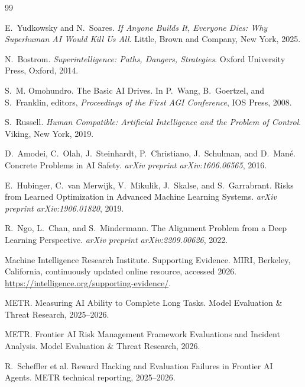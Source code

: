 \documentclass[11pt]{article}
\begin{document}
\begin{thebibliography}{99}

E.~Yudkowsky and N.~Soares.
\newblock \emph{If Anyone Builds It, Everyone Dies: Why Superhuman AI Would Kill Us All}.
\newblock Little, Brown and Company, New York, 2025.

N.~Bostrom.
\newblock \emph{Superintelligence: Paths, Dangers, Strategies}.
\newblock Oxford University Press, Oxford, 2014.

S.~M. Omohundro.
\newblock The Basic AI Drives.
\newblock In P.~Wang, B.~Goertzel, and S.~Franklin, editors,
\emph{Proceedings of the First AGI Conference}, IOS Press, 2008.

S.~Russell.
\newblock \emph{Human Compatible: Artificial Intelligence and the Problem of Control}.
\newblock Viking, New York, 2019.

D.~Amodei, C.~Olah, J.~Steinhardt, P.~Christiano,
J.~Schulman, and D.~Man\'e.
\newblock Concrete Problems in AI Safety.
\newblock \emph{arXiv preprint arXiv:1606.06565}, 2016.

E.~Hubinger, C.~van Merwijk, V.~Mikulik, J.~Skalse, and S.~Garrabrant.
\newblock Risks from Learned Optimization in Advanced Machine Learning Systems.
\newblock \emph{arXiv preprint arXiv:1906.01820}, 2019.

R.~Ngo, L.~Chan, and S.~Mindermann.
\newblock The Alignment Problem from a Deep Learning Perspective.
\newblock \emph{arXiv preprint arXiv:2209.00626}, 2022.

Machine Intelligence Research Institute.
\newblock Supporting Evidence.
\newblock MIRI, Berkeley, California, continuously updated online resource,
accessed 2026.
\newblock \url{https://intelligence.org/supporting-evidence/}.

METR.
\newblock Measuring AI Ability to Complete Long Tasks.
\newblock Model Evaluation \& Threat Research, 2025--2026.

METR.
\newblock Frontier AI Risk Management Framework Evaluations and Incident Analysis.
\newblock Model Evaluation \& Threat Research, 2026.

R.~Scheffler et al.
\newblock Reward Hacking and Evaluation Failures in Frontier AI Agents.
\newblock METR technical reporting, 2025--2026.


\end{thebibliography}
\end{document}
